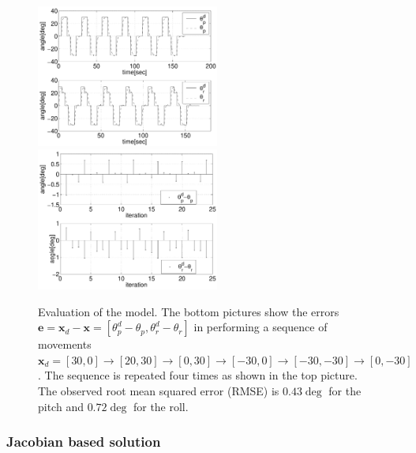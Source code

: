 \documentclass[conference]{IEEEtran}
\numberwithin{equation}{section}
\newcommand{\x}{\mathbf{x}}
\begin{document}
\begin{figure}[tbp]
\centering 
\includegraphics[width=60mm]{image/AngleModel.pdf} 
\includegraphics[width=60mm]{image/ErrorsModel.pdf} 
\caption{Evaluation of the model. The bottom pictures show the errors $\mathbf e = \x_d - \x  = [\theta_p^d - \theta_p, \theta_r^d - \theta_r]$ in performing a sequence of movements $\x_d = [30, 0] \rightarrow[20, 30] \rightarrow[0, 30] \rightarrow[-30, 0] \rightarrow[-30, -30] \rightarrow[0, -30]$. The sequence is repeated four times as shown in the top picture. The observed root mean squared error (RMSE) is $0.43 \deg$ for the pitch and $0.72 \deg$ for the roll.}
\label{Fig:ErrorModel}
\end{figure}

\subsubsection{Jacobian based solution} \label{Sec:JacobianSolution}
\end{document}
